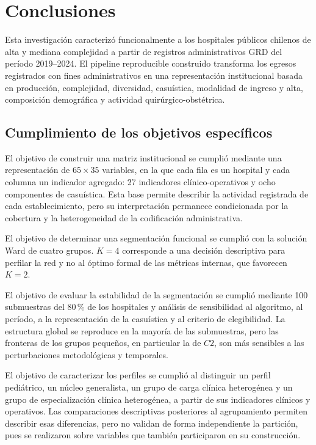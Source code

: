 
\chapter{Conclusiones}
\label{cap:conclusiones}

Esta investigación caracterizó funcionalmente a los hospitales públicos chilenos
de alta y mediana complejidad a partir de registros administrativos GRD del
período 2019--2024. El pipeline reproducible construido transforma los egresos
registrados con fines administrativos en una representación institucional basada
en producción, complejidad, diversidad, casuística, modalidad de ingreso y alta,
composición demográfica y actividad quirúrgico-obstétrica.

\section{Cumplimiento de los objetivos específicos}

El objetivo de construir una matriz institucional se cumplió mediante
una representación de $65 \times 35$ variables, en la que cada fila es un
hospital y cada columna un indicador agregado: 27 indicadores
clínico-operativos y ocho componentes de casuística. Esta base permite describir
la actividad registrada de cada establecimiento, pero su interpretación permanece
condicionada por la cobertura y la heterogeneidad de la codificación administrativa.

El objetivo de determinar una segmentación funcional se cumplió con la solución
Ward de cuatro grupos. $K=4$ corresponde a una decisión descriptiva para
perfilar la red y no al óptimo formal de las métricas internas, que favorecen
$K=2$.

El objetivo de evaluar la estabilidad de la segmentación se cumplió mediante
100 submuestras del 80\,\% de los hospitales y análisis de sensibilidad al
algoritmo, al período, a la representación de la casuística y al criterio de
elegibilidad. La estructura global se reproduce en la mayoría de las
submuestras, pero las fronteras de los grupos pequeños, en particular la de
$C2$, son más sensibles a las perturbaciones metodológicas y temporales.

El objetivo de caracterizar los perfiles se cumplió al distinguir un perfil
pediátrico, un núcleo generalista, un grupo de carga clínica heterogénea y un
grupo de especialización clínica heterogénea, a partir de sus indicadores
clínicos y operativos. Las comparaciones descriptivas posteriores al agrupamiento
permiten describir esas diferencias, pero no validan de forma independiente la
partición, pues se realizaron sobre variables que también participaron en su
construcción.

